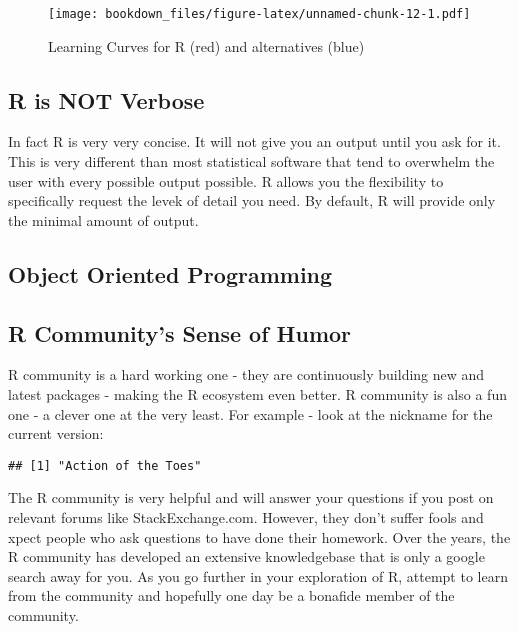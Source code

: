 \documentclass[
]{krantz}
\makeatletter
\newenvironment{Shaded}{\begin{snugshade}}{\end{snugshade}}
\newcommand{\NormalTok}[1]{#1}
\newcommand{\OperatorTok}[1]{\textcolor[rgb]{0.43,0.43,0.43}{\textbf{#1}}}
\newenvironment{kframe}{%
\medskip{}
\setlength{\fboxsep}{.8em}
 \def\at@end@of@kframe{}%
 \ifinner\ifhmode%
  \def\at@end@of@kframe{\end{minipage}}%
  \begin{minipage}{\columnwidth}%
 \fi\fi%
 \def\FrameCommand##1{\hskip\@totalleftmargin \hskip-\fboxsep
 \colorbox{shadecolor}{##1}\hskip-\fboxsep
     \hskip-\linewidth \hskip-\@totalleftmargin \hskip\columnwidth}%
 \MakeFramed {\advance\hsize-\width
   \@totalleftmargin\z@ \linewidth\hsize
   \@setminipage}}%
 {\par\unskip\endMakeFramed%
 \at@end@of@kframe}
\renewenvironment{Shaded}{\begin{kframe}}{\end{kframe}}
\makeatother
\begin{document}
\begin{figure}
\centering
\texttt{[image: bookdown\_files/figure-latex/unnamed-chunk-12-1.pdf]}
\caption{\label{fig:unnamed-chunk-12}Learning Curves for R (red) and alternatives (blue)}
\end{figure}

\hypertarget{r-is-not-verbose}{%
\subsection{R is NOT Verbose}\label{r-is-not-verbose}}

In fact R is very very concise. It will not give you an output until you ask for it. This is very different than most statistical software that tend to overwhelm the user with every possible output possible. R allows you the flexibility to specifically request the levek of detail you need. By default, R will provide only the minimal amount of output.

\hypertarget{object-oriented-programming}{%
\subsection{Object Oriented Programming}\label{object-oriented-programming}}

\hypertarget{r-communitys-sense-of-humor}{%
\subsection{R Community's Sense of Humor}\label{r-communitys-sense-of-humor}}

R community is a hard working one - they are continuously building new and latest packages - making the R ecosystem even better. R community is also a fun one - a clever one at the very least. For example - look at the nickname for the current version:

\begin{Shaded}
\end{Shaded}

\begin{verbatim}
## [1] "Action of the Toes"
\end{verbatim}

The R community is very helpful and will answer your questions if you post on relevant forums like StackExchange.com. However, they don't suffer fools and xpect people who ask questions to have done their homework. Over the years, the R community has developed an extensive knowledgebase that is only a google search away for you. As you go further in your exploration of R, attempt to learn from the community and hopefully one day be a bonafide member of the community.
\end{document}

